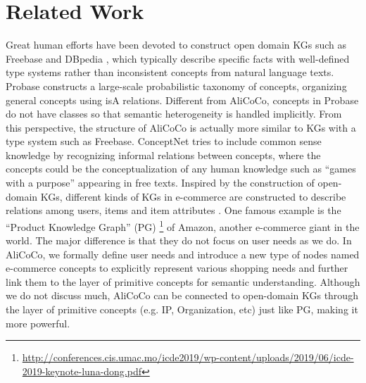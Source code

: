 \section{Related Work}
\label{sec:related}

Great human efforts have been devoted to construct open domain KGs such as Freebase \cite{bollacker2008freebase} and DBpedia \cite{auer2007dbpedia}, 
which typically describe specific facts with well-defined type systems rather than inconsistent concepts from natural language texts. 
Probase \cite{wu2012probase} constructs a large-scale probabilistic taxonomy of concepts, organizing general concepts using isA relations. 
Different from AliCoCo, concepts in Probase do not have classes so that semantic heterogeneity is handled implicitly.
From this perspective, the structure of AliCoCo is actually more similar to KGs with a type system such as Freebase.
ConceptNet \cite{speer2012representing} tries to include common sense knowledge by recognizing informal relations between concepts, where the concepts could be the conceptualization of any human knowledge such as ``games with a purpose'' appearing in free texts.
Inspired by the construction of open-domain KGs, different kinds of KGs in e-commerce are constructed
to describe relations among users, items and item attributes \cite{catherine2017explainable,ai2018learning}.
One famous example is the ``Product Knowledge Graph'' (PG) \footnote{\url{http://conferences.cis.umac.mo/icde2019/wp-content/uploads/2019/06/icde-2019-keynote-luna-dong.pdf}} of Amazon, another e-commerce giant in the world. The major difference is that they do not focus on user needs as we do.
In AliCoCo, we formally define user needs and introduce a new type of nodes named e-commerce concepts to explicitly represent various shopping needs and further link them to the layer of primitive concepts for semantic understanding. 
Although we do not discuss much, AliCoCo can be connected to open-domain KGs through the layer of primitive concepts (e.g. IP, Organization, etc) just like PG, 
making it more powerful.

